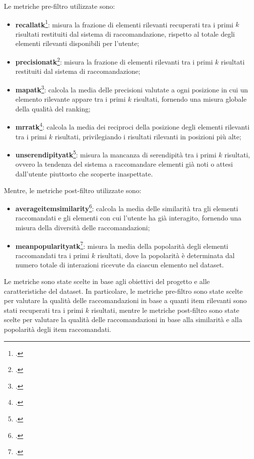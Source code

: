Le metriche pre-filtro utilizzate sono:
\begin{itemize}
    \item \textbf{\gls{recallatk}}\footcite{site:recall}: misura la frazione di elementi rilevanti recuperati tra i primi $k$ risultati restituiti dal sistema di raccomandazione, rispetto al totale degli elementi rilevanti disponibili per l'utente;
    \item \textbf{\gls{precisionatk}}\footcite{site:precision_at_k}: misura la frazione di elementi rilevanti tra i primi $k$ risultati restituiti dal sistema di raccomandazione;
    \item \textbf{\gls{mapatk}}\footcite{site:mean_average_precision}: calcola la media delle precisioni valutate a ogni posizione in cui un elemento rilevante appare tra i primi $k$ risultati, fornendo una misura globale della qualità del ranking;
    \item \textbf{\gls{mrratk}}\footcite{site:mean_reciprocal_rank}: calcola la media dei reciproci della posizione degli elementi rilevanti tra i primi $k$ risultati, privilegiando i risultati rilevanti in posizioni più alte;
    \item \textbf{\gls{unserendipityatk}}\footcite{article:serendipity-recommender-systems}: misura la mancanza di serendipità tra i primi $k$ risultati, ovvero la tendenza del sistema a raccomandare elementi già noti o attesi dall'utente piuttosto che scoperte inaspettate.
\end{itemize}

Mentre, le metriche post-filtro utilizzate sono:
\begin{itemize}
    \item \textbf{\gls{averageitemsimilarity}}\footcite{site:average_item_similarity}: calcola la media delle similarità tra gli elementi raccomandati e gli elementi con cui l'utente ha già interagito, fornendo una misura della diversità delle raccomandazioni;
    \item \textbf{\gls{meanpopularityatk}}\footcite{article:mean_popularity}: misura la media della popolarità degli elementi raccomandati tra i primi $k$ risultati, dove la popolarità è determinata dal numero totale di interazioni ricevute da ciascun elemento nel dataset.
\end{itemize}

Le metriche sono state scelte in base agli obiettivi del progetto e alle caratteristiche del dataset. In particolare, le metriche pre-filtro sono state scelte per valutare la qualità delle raccomandazioni in base a quanti item rilevanti sono stati recuperati tra i primi $k$ risultati, mentre le metriche post-filtro sono state scelte per valutare la qualità delle raccomandazioni in base alla similarità e alla popolarità degli item raccomandati.

